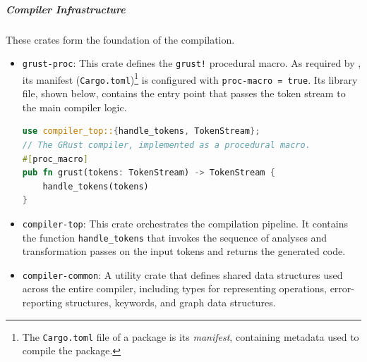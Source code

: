 \subparagraph{Compiler Infrastructure}
These crates form the foundation of the compilation.
\begin{itemize}
    \item \texttt{grust-proc}: This crate defines the \texttt{grust!} procedural macro. As required
          by \Rust, its manifest (\texttt{Cargo.toml})\footnote{The \texttt{Cargo.toml} file of a
              package is its \emph{manifest}, containing metadata used to compile the package.} is
          configured with \texttt{proc-macro = true}. Its library file, shown below, contains the
          entry point that passes the token stream to the main compiler logic.
          \begin{lstlisting}[language=Rust,numbers=none]
use compiler_top::{handle_tokens, TokenStream};
// The GRust compiler, implemented as a procedural macro.
#[proc_macro]
pub fn grust(tokens: TokenStream) -> TokenStream {
    handle_tokens(tokens)
}
\end{lstlisting}

    \item \texttt{compiler-top}: This crate orchestrates the compilation pipeline. It contains the
          function \texttt{handle\_tokens} that invokes the sequence of analyses and transformation
          passes on the input tokens and returns the generated \Rust code.

    \item \texttt{compiler-common}: A utility crate that defines shared data structures used across
          the entire compiler, including types for representing \GRust operations, error-reporting
          structures, keywords, and graph data structures.
\end{itemize}

